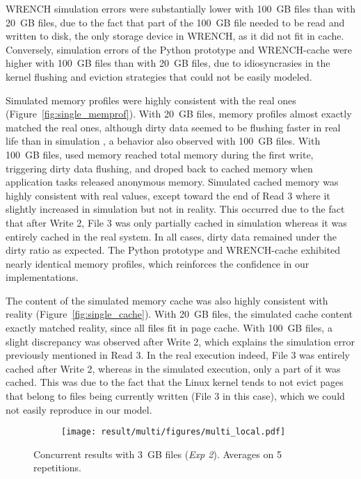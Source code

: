 \documentclass[conference]{IEEEtran}
\newcommand{\tristan}[1]{}%
\newcommand{\wrench}{WRENCH\xspace}
\begin{document}
        \wrench simulation errors were substantially lower with 100~GB
        files than with 20~GB files, due to the fact that part of the
        100~GB file needed to be read and written to disk, the only storage
        device in \wrench, as it did not fit in cache. Conversely,
        simulation errors of the Python prototype and \wrench-cache were higher with
        100~GB files than with 20~GB files, due to idiosyncrasies in the kernel
        flushing and eviction strategies that could not be easily modeled.

        Simulated memory profiles were highly consistent with the real ones
        (Figure~\ref{fig:single_memprof}). With 20~GB files, memory profiles almost exactly matched the
        real ones, although dirty data seemed to be flushing faster in real
        life than in simulation \tristan{any idea why?}, a behavior also
        observed with 100~GB files. With 100~GB files, used memory reached
        total memory during the first write, triggering dirty data
        flushing, and droped back to cached memory when application tasks
        released anonymous memory. Simulated cached memory was highly
        consistent with real values, except toward the end of Read 3 where
        it slightly increased in simulation but not in reality. This
        occurred due to the fact that after Write 2, File 3 was only partially
        cached in simulation whereas it was entirely cached in the real
        system. In all cases, dirty data remained under the dirty ratio as
        expected. The Python prototype and \wrench-cache exhibited nearly
        identical memory profiles, which reinforces the confidence in our
        implementations.

        The content of the simulated memory cache was also highly
        consistent with reality (Figure~\ref{fig:single_cache}). With 20~GB
        files, the simulated cache content exactly matched reality, since
        all files fit in page cache. With 100~GB files, a slight
        discrepancy was observed after Write 2, which explains the
        simulation error previously mentioned in Read 3. In the real
        execution indeed, File 3 was entirely cached after Write 2, whereas
        in the simulated execution, only a part of it was cached. This was
        due to the fact that the Linux kernel tends to not evict pages that
        belong to files being currently written (File 3 in this case),
        which we could not easily reproduce in our model.

            \begin{figure*}
                \begin{subfigure}{\linewidth}
                    \centering
                    \texttt{[image: result/multi/figures/multi\_local.pdf]}
                \end{subfigure}
                \caption{Concurrent results with 3~GB files (\textit{Exp 2}). Averages on 5 repetitions.}
                \label{fig:multi_local}
            \end{figure*}
\end{document}
